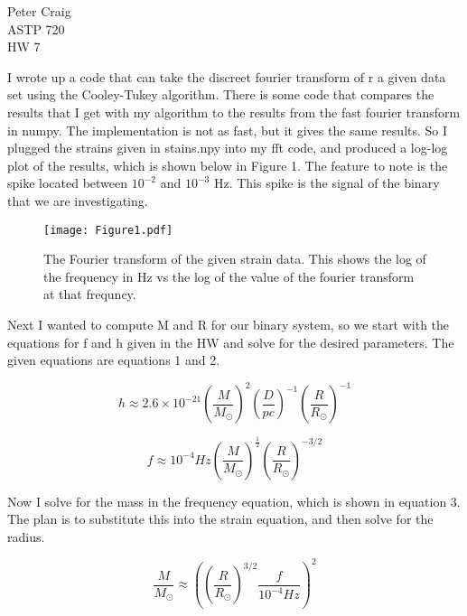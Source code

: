 \documentclass{article}
\begin{document}
\begin{flushleft}
Peter Craig\\
ASTP 720\\
HW 7\\
\end{flushleft}

I wrote up a code that can take the discreet fourier transform of r a given data set using the Cooley-Tukey algorithm. There is some code that compares the results that I get with my algorithm to the results from the fast fourier transform in numpy. The implementation is not as fast, but it gives the same results. So I plugged the strains given in stains.npy into my fft code, and produced a log-log plot of the results, which is shown below in Figure 1. The feature to note is the spike located between $10^{-2}$ and $10^{-3}$ Hz. This spike is the signal of the binary that we are investigating.

\begin{figure}[H]\label{f1}
  \begin{center}
  \texttt{[image: Figure1.pdf]}
  \caption{The Fourier transform of the given strain data. This shows the log of the frequency in Hz vs the log of the value of the fourier transform at that frequncy.}
  \end{center}
\end{figure}

Next I wanted to compute M and R for our binary system, so we start with the equations for f and h given in the HW and solve for the desired parameters. The given equations are equations 1 and 2.


\begin{equation}\label{h}
h \approx 2.6 \times 10^{-21} (\frac{M}{M_\odot})^2 (\frac{D}{pc}) ^{-1}(\frac{R}{R_\odot})^{-1}
\end{equation}

\begin{equation}\label{freq}
f \approx 10^{-4} Hz  (\frac{M}{M_\odot})^\frac{1}{2} (\frac{R}{R_\odot})^{-3/2}
\end{equation}

Now I solve for the mass in the frequency equation, which is shown in equation 3. The plan is to substitute this into the strain equation, and then solve for the radius.

\begin{equation}\label{Mass}
  \frac{M}{M_\odot} \approx  ( (\frac{R}{R_\odot})^{3/2} \frac{f}{10^{-4} Hz})^2 
\end{equation}
\end{document}
